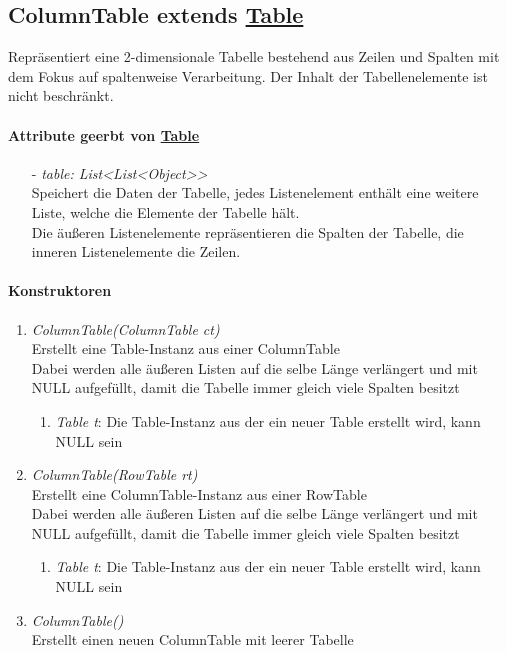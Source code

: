 \subsection*{ColumnTable extends \hyperref[Table]{Table}}\label{colTable}

Repräsentiert eine 2-dimensionale Tabelle bestehend aus Zeilen und Spalten mit dem Fokus auf spaltenweise Verarbeitung. Der Inhalt der Tabellenelemente ist nicht beschränkt.


\paragraph{Attribute geerbt von \hyperref[Table]{Table}}

\begin{itemize}
	\item[-] \textit{table: List{<List<Object>}>} \\
	Speichert die Daten der Tabelle, jedes Listenelement enthält eine weitere Liste, welche die Elemente der Tabelle hält. \\
	Die äußeren Listenelemente repräsentieren die Spalten der Tabelle, die inneren Listenelemente die Zeilen.
\end{itemize}


\paragraph{Konstruktoren}

\begin{enumerate}[+]
	\item \textit{ColumnTable(ColumnTable ct)} \\
	Erstellt eine Table-Instanz aus einer ColumnTable \\
	Dabei werden alle äußeren Listen auf die selbe Länge verlängert und mit NULL aufgefüllt, damit die Tabelle immer gleich viele Spalten besitzt	
	\begin{enumerate}[$\bullet$]
		\item \textit{Table t}: Die Table-Instanz aus der ein neuer Table erstellt wird, kann NULL sein
	\end{enumerate}
	\vspace{-0.2cm}
	
	\item \textit{ColumnTable(RowTable rt)} \\
	Erstellt eine ColumnTable-Instanz aus einer RowTable \\
	Dabei werden alle äußeren Listen auf die selbe Länge verlängert und mit NULL aufgefüllt, damit die Tabelle immer gleich viele Spalten besitzt	
	\begin{enumerate}[$\bullet$]
		\item \textit{Table t}: Die Table-Instanz aus der ein neuer Table erstellt wird, kann NULL sein
	\end{enumerate}
	\vspace{-0.2cm}
	
	\item \textit{ColumnTable()} \\
	Erstellt einen neuen ColumnTable mit leerer Tabelle
\end{enumerate}

